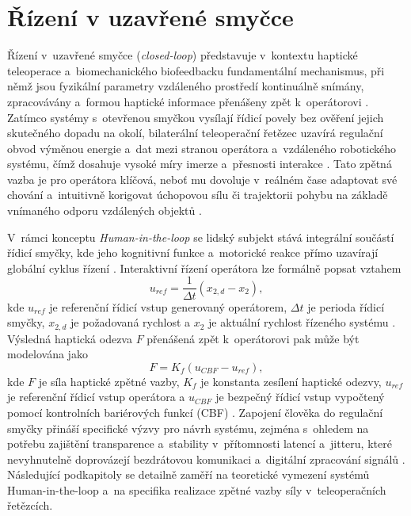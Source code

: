 \documentclass[FZS,DP]{tulthesis}
\begin{document}
\section{Řízení v uzavřené smyčce}
Řízení v~uzavřené smyčce (\textit{closed-loop}) představuje v~kontextu haptické teleoperace a~biomechanického biofeedbacku fundamentální mechanismus, při němž jsou fyzikální parametry vzdáleného prostředí kontinuálně snímány, zpracovávány a~formou haptické informace přenášeny zpět k~operátorovi \cite{Kos2018, Suman2025, GIUDICI2025}.
Zatímco systémy s~otevřenou smyčkou vysílají řídicí povely bez ověření jejich skutečného dopadu na okolí, bilaterální teleoperační řetězec uzavírá regulační obvod výměnou energie a~dat mezi stranou operátora a~vzdáleného robotického systému, čímž dosahuje vysoké míry imerze a~přesnosti interakce \cite{Aijaz2018, GIUDICI2025, Thomas2023110}.
Tato zpětná vazba je pro operátora klíčová, neboť mu dovoluje v~reálném čase adaptovat své chování a~intuitivně korigovat úchopovou sílu či trajektorii pohybu na základě vnímaného odporu vzdálených objektů \cite{Mayer2020427, Suman2025, Thomas2023110}.

V~rámci konceptu \textit{Human-in-the-loop} se lidský subjekt stává integrální součástí řídicí smyčky, kde jeho kognitivní funkce a~motorické reakce přímo uzavírají globální cyklus řízení \cite{Aijaz2018, Thomas2023110, Zhang2021530}.
Interaktivní řízení operátora lze formálně popsat vztahem
%
\begin{equation}
    u_{ref} = \frac{1}{\Delta t}\left(x_{2,d} - x_2\right),
\end{equation}
%
kde $u_{ref}$ je referenční řídicí vstup generovaný operátorem,
$\Delta t$ je perioda řídicí smyčky, $x_{2,d}$ je požadovaná rychlost
a $x_2$ je aktuální rychlost řízeného systému \cite{Zhang2021530}.
Výsledná haptická odezva $F$ přenášená zpět k~operátorovi pak může být modelována jako
%
\begin{equation}
    F = K_f \left(u_{CBF} - u_{ref}\right),
\end{equation}
%
kde $F$ je síla haptické zpětné vazby, $K_f$ je konstanta zesílení
haptické odezvy, $u_{ref}$ je referenční řídicí vstup operátora
a $u_{CBF}$ je bezpečný řídicí vstup vypočtený pomocí kontrolních
bariérových funkcí (CBF) \cite{Zhang2021530}.
Zapojení člověka do regulační smyčky přináší specifické výzvy pro návrh systému, zejména s~ohledem na potřebu zajištění transparence a~stability v~přítomnosti latencí a~jitteru, které nevyhnutelně doprovázejí bezdrátovou komunikaci a~digitální zpracování signálů \cite{Bolarinwa2022, Papakonstantinou20251218, Suman2025}.
Následující podkapitoly se detailně zaměří na teoretické vymezení systémů Human-in-the-loop a~na specifika realizace zpětné vazby síly v~teleoperačních řetězcích.
\end{document}
